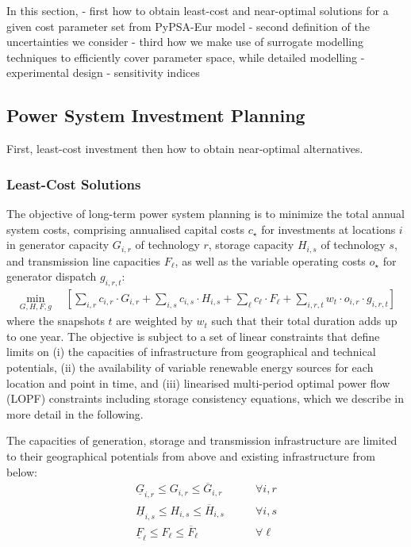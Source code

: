In this section,
- first how to obtain least-cost and near-optimal solutions for a given cost parameter set from PyPSA-Eur model
- second definition of the uncertainties we consider
- third how we make use of surrogate modelling techniques to efficiently cover parameter space,
  while detailed modelling
- experimental design
- sensitivity indices

\subsection{Power System Investment Planning}
\label{sec:model}

First, least-cost investment then how to obtain near-optimal alternatives.

\subsubsection{Least-Cost Solutions}

The objective of long-term power system planning is to minimize the total
annual system costs, comprising annualised capital costs $c_\star$ for investments at locations $i$
in generator capacity $G_{i,r}$ of technology $r$, storage capacity $H_{i,s}$ of technology $s$, and transmission line capacities
$F_{\ell}$, as well as the variable operating costs $o_\star$ for generator dispatch $g_{i,r,t}$:
\begin{align}
    \min_{G,H,F,g} \quad \left[
        \sum_{i,r} c_{i,r}\cdot G_{i,r} +
        \sum_{i,s} c_{i,s}\cdot H_{i,s} +
        \sum_{\ell}c_{\ell}\cdot F_{\ell}+
        \sum_{i,r,t}w_t\cdot o_{i,r} \cdot g_{i,r,t}
    \right]
    \label{eq:objective}
\end{align}
where the snapshots $t$ are weighted by $w_t$ such that their total duration
adds up to one year. The objective is subject to a set of linear constraints that define limits on
(i) the capacities of infrastructure from geographical and technical potentials,
(ii) the availability of variable renewable energy sources for each location and point in time, and
(iii) linearised multi-period optimal power flow (LOPF) constraints including storage consistency equations,
which we describe in more detail in the following.

The capacities of generation, storage and transmission infrastructure are
limited to their geographical potentials from above and existing infrastructure from below:
\begin{align}
    \label{eq:firstA}
    \underline{G}_{i,r}  \leq G_{i,r}  \leq \overline{G}_{i,r}  &\qquad\forall i, r \\
    \underline{H}_{i,s}  \leq H_{i,s}  \leq \overline{H}_{i,s}  &\qquad\forall i, s \\
    \underline{F}_{\ell} \leq F_{\ell} \leq \overline{F}_{\ell} &\qquad\forall \ell
\end{align}

